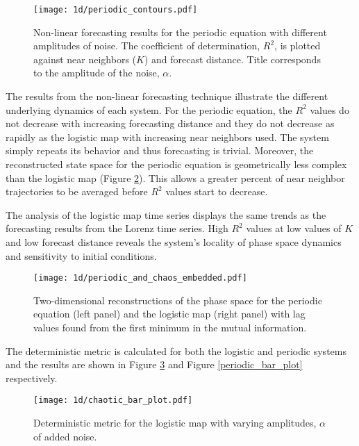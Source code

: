 \begin{figure}[htbp]  %
   \centering
   \texttt{[image: 1d/periodic\_contours.pdf]} 
   \caption{Non-linear forecasting results for the periodic equation with different amplitudes of noise. The coefficient of determination, $R^2$, is plotted against near neighbors ($K$) and forecast distance. Title corresponds to the amplitude of the noise, $\alpha$.}
   \label{periodic_contours}
\end{figure}

The results from the non-linear forecasting technique illustrate the different underlying dynamics of each system. For the periodic equation, the $R^2$ values do not decrease with increasing forecasting distance and they do not decrease as rapidly as the logistic map with increasing near neighbors used.  The system simply repeats its behavior and thus forecasting is trivial.  Moreover, the reconstructed state space for the periodic equation is geometrically less complex than the logistic map (Figure \ref{phase_spaces}). This allows a greater percent of near neighbor trajectories to be averaged before $R^2$ values start to decrease.

The analysis of the logistic map time series displays the same trends as the forecasting results from the Lorenz time series. High $R^2$ values at low values of $K$ and low forecast distance reveals the system's locality of phase space dynamics and sensitivity to initial conditions. 

\begin{figure}[htbp]  %
   \centering
   \texttt{[image: 1d/periodic\_and\_chaos\_embedded.pdf]} 
   \caption{Two-dimensional reconstructions of the phase space for the periodic equation (left panel) and the logistic map (right panel) with lag values found from the first minimum in the mutual information.}
   \label{phase_spaces}
\end{figure}


The deterministic metric is calculated for both the logistic and periodic systems and the results are shown in Figure \ref{logistic_bar_plot} and Figure \ref{periodic_bar_plot} respectively.



\begin{figure}[htbp]  %
   \centering
   \texttt{[image: 1d/chaotic\_bar\_plot.pdf]} 
   \caption{Deterministic metric for the logistic map  with varying amplitudes, $\alpha$ of added noise.}
   \label{logistic_bar_plot}
\end{figure}

